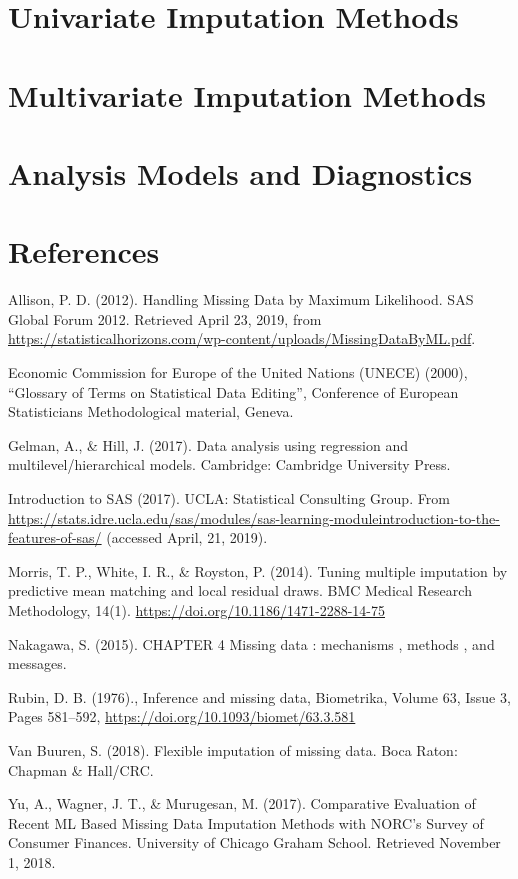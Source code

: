 \documentclass[12pt,oneside]{chicagocapstone}
\begin{document}
\chapter{Univariate Imputation
Methods}\label{univariate-imputation-methods}

\chapter{Multivariate Imputation
Methods}\label{multivariate-imputation-methods}

\chapter{Analysis Models and
Diagnostics}\label{analysis-models-and-diagnostics}

\backmatter

\chapter*{References}\label{references}

Allison, P. D. (2012). Handling Missing Data by Maximum Likelihood. SAS
Global Forum 2012. Retrieved April 23, 2019, from\\
\url{https://statisticalhorizons.com/wp-content/uploads/MissingDataByML.pdf}.

Economic Commission for Europe of the United Nations (UNECE) (2000),
``Glossary of Terms on Statistical Data Editing'', Conference of
European Statisticians Methodological material, Geneva.

Gelman, A., \& Hill, J. (2017). Data analysis using regression and
multilevel/hierarchical models. Cambridge: Cambridge University Press.

Introduction to SAS (2017). UCLA: Statistical Consulting Group. From
\url{https://stats.idre.ucla.edu/sas/modules/sas-learning-moduleintroduction-to-the-features-of-sas/}
(accessed April, 21, 2019).

Morris, T. P., White, I. R., \& Royston, P. (2014). Tuning multiple
imputation by predictive mean matching and local residual draws. BMC
Medical Research Methodology, 14(1).
\url{https://doi.org/10.1186/1471-2288-14-75}

Nakagawa, S. (2015). CHAPTER 4 Missing data : mechanisms , methods , and
messages.

Rubin, D. B. (1976)., Inference and missing data, Biometrika, Volume 63,
Issue 3, Pages 581--592, \url{https://doi.org/10.1093/biomet/63.3.581}

Van Buuren, S. (2018). Flexible imputation of missing data. Boca Raton:
Chapman \& Hall/CRC.

Yu, A., Wagner, J. T., \& Murugesan, M. (2017). Comparative Evaluation
of Recent ML Based Missing Data Imputation Methods with NORC's Survey of
Consumer Finances. University of Chicago Graham School. Retrieved
November 1, 2018.


\end{document}
